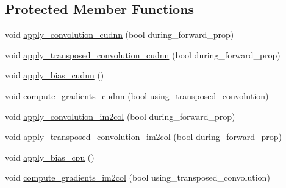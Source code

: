 \subsection*{Protected Member Functions}
\begin{DoxyCompactItemize}
\item 
void \hyperlink{classlbann_1_1base__convolution__layer_a1c6e967ab0c66cfa0d27f7abfbbf2be8}{apply\+\_\+convolution\+\_\+cudnn} (bool during\+\_\+forward\+\_\+prop)
\item 
void \hyperlink{classlbann_1_1base__convolution__layer_a130907ca7a8e3b6676bdd4186c788ef4}{apply\+\_\+transposed\+\_\+convolution\+\_\+cudnn} (bool during\+\_\+forward\+\_\+prop)
\item 
void \hyperlink{classlbann_1_1base__convolution__layer_aa33e490222597c4c5203d94061ae9d88}{apply\+\_\+bias\+\_\+cudnn} ()
\item 
void \hyperlink{classlbann_1_1base__convolution__layer_ae46e6a975c443792c606817878dc4446}{compute\+\_\+gradients\+\_\+cudnn} (bool using\+\_\+transposed\+\_\+convolution)
\item 
void \hyperlink{classlbann_1_1base__convolution__layer_a0710d46aa54d92f94de920ed37f6ef11}{apply\+\_\+convolution\+\_\+im2col} (bool during\+\_\+forward\+\_\+prop)
\item 
void \hyperlink{classlbann_1_1base__convolution__layer_a87fb2bf066a98052938e48a82dcd4fd2}{apply\+\_\+transposed\+\_\+convolution\+\_\+im2col} (bool during\+\_\+forward\+\_\+prop)
\item 
void \hyperlink{classlbann_1_1base__convolution__layer_a4f792e1c19d4591f305880b57f63cec3}{apply\+\_\+bias\+\_\+cpu} ()
\item 
void \hyperlink{classlbann_1_1base__convolution__layer_a8cb0b4fb33f058ce6c211ebaf6a17f63}{compute\+\_\+gradients\+\_\+im2col} (bool using\+\_\+transposed\+\_\+convolution)
\end{DoxyCompactItemize}
